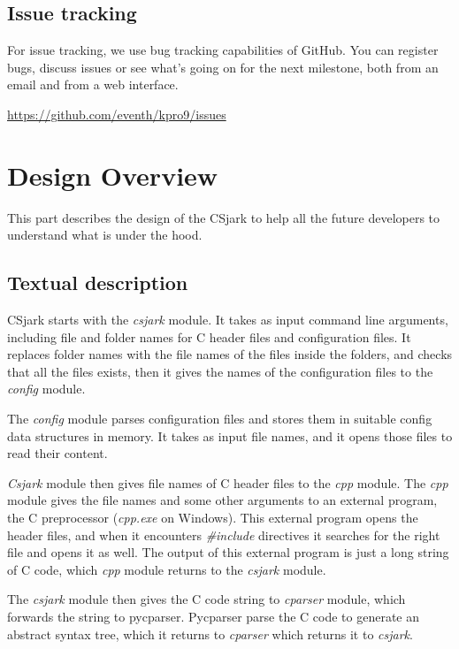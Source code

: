 \documentclass[A4paper,10pt,english]{sphinxmanual}
\begin{document}
\subsection{Issue tracking}
\label{devel/general:issue-tracking}
For issue tracking, we use bug tracking capabilities of GitHub. You can register bugs, discuss issues or see what’s going on for the next milestone, both from an email and from a web interface.

\href{https://github.com/eventh/kpro9/issues}{https://github.com/eventh/kpro9/issues}


\section{Design Overview}
\label{devel/design::doc}\label{devel/design:design-overview}
This part describes the design of the CSjark to help all the future developers to understand what is under the hood.


\subsection{Textual description}
\label{devel/design:textual-description}
CSjark starts with the \emph{csjark} module. It takes as input command line arguments, including file and folder names for C header files and configuration files.
It replaces folder names with the file names of the files inside the folders, and checks that all the files exists, then it gives the names of the configuration files to the \emph{config} module.

The \emph{config} module parses configuration files and stores them in suitable config data structures in memory. It takes as input file names, and it opens those files to read their content.

\emph{Csjark} module then gives file names of C header files to the \emph{cpp} module. The \emph{cpp} module gives the file names and some other arguments to an external program, the C preprocessor (\emph{cpp.exe} on Windows). This external program opens the header files, and when it encounters \emph{\#include} directives it searches for the right file and opens it as well. The output of this external program is just a long string of C code, which \emph{cpp} module returns to the \emph{csjark} module.

The \emph{csjark} module then gives the C code string to \emph{cparser} module, which forwards the string to pycparser. Pycparser parse the C code to generate an abstract syntax tree, which it returns to \emph{cparser} which returns it to \emph{csjark}.
\end{document}
